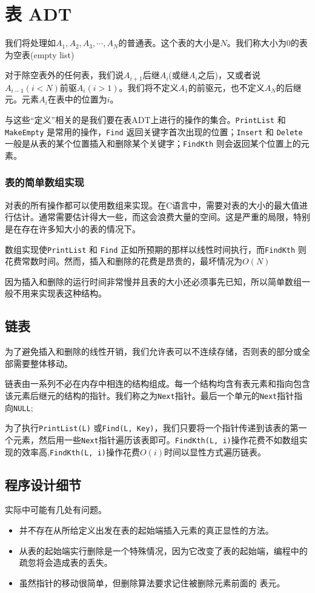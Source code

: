\documentclass[utf8]{ctexbook}
\begin{document}
\section{表 ADT}
我们将处理如$A_1, A_2, A_3, \cdots , A_N$的普通表。这个表的大小是$N$。我们称大小为0的表为{\kaishu 空表(empty list)}

对于除空表外的任何表，我们说$A_{i+1}$后继$A_i$(或继$A_i$之后)，又或者说$A_{i-1}(i < N)$前驱$A_i ( i> 1)$。我们将不定义$A_1$的前驱元，也不定义$A_N$的后继元。元素$A_i$在表中的位置为$i$。

与这些“定义”相关的是我们要在表ADT上进行的操作的集合。\verb|PrintList| 和 \verb|MakeEmpty| 是常用的操作，\verb|Find| 返回关键字首次出现的位置；\verb|Insert| 和 \verb|Delete| 一般是从表的某个位置插入和删除某个关键字；\verb|FindKth| 则会返回某个位置上的元素。

\subsubsection{表的简单数组实现}
对表的所有操作都可以使用数组来实现。在C语言中，需要对表的大小的最大值进行估计。通常需要估计得大一些，而这会浪费大量的空间。这是严重的局限，特别是在存在许多知大小的表的情况下。

数组实现使\verb|PrintList| 和 \verb|Find| 正如所预期的那样以线性时间执行，而\verb|FindKth| 则花费常数时间。然而，插入和删除的花费是昂贵的，最坏情况为$O(N)$

因为插入和删除的运行时间非常慢并且表的大小还必须事先已知，所以简单数组一般不用来实现表这种结构。

\subsection{链表}
为了避免插入和删除的线性开销，我们允许表可以不连续存储，否则表的部分或全部需要整体移动。

链表由一系列不必在内存中相连的结构组成。每一个结构均含有表元素和指向包含该元素后继元的结构的指针。我们称之为\verb|Next|指针。最后一个单元的\verb|Next|指针指向\verb|NULL|;

为了执行\verb|PrintList(L)| 或\verb|Find(L, Key)|，我们只要将一个指针传递到该表的第一个元素，然后用一些\verb|Next|指针遍历该表即可。\verb|FindKth(L, i)|操作花费不如数组实现的效率高,\verb|FindKth(L, i)|操作花费$O(i)$时间以显性方式遍历链表。
\subsection{程序设计细节}
实际中可能有几处有问题。
\begin{itemize}
    \item 并不存在从所给定义出发在表的起始端插入元素的真正显性的方法。
    \item 从表的起始端实行删除是一个特殊情况，因为它改变了表的起始端，编程中的疏忽将会造成表的丢失。
    \item 虽然指针的移动很简单，但删除算法要求记住被删除元素{\kaishu 前面的} 表元。
\end{itemize}
\end{document}
